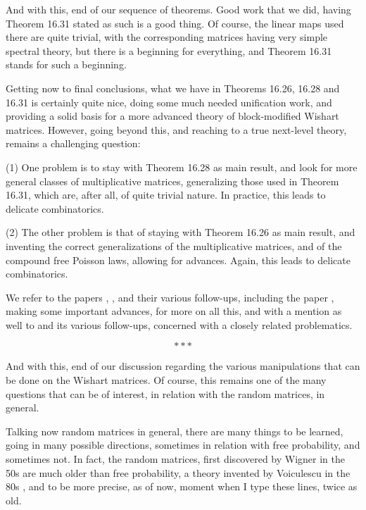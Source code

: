 \documentclass[12pt]{amsbook}
\begin{document}
And with this, end of our sequence of theorems. Good work that we did, having Theorem 16.31 stated as such is a good thing. Of course, the linear maps used there are quite trivial, with the corresponding matrices having very simple spectral theory, but there is a beginning for everything, and Theorem 16.31 stands for such a beginning.

\bigskip

Getting now to final conclusions, what we have in Theorems 16.26, 16.28 and 16.31 is certainly quite nice, doing some much needed unification work, and providing a solid basis for a more advanced theory of block-modified Wishart matrices. However, going beyond this, and reaching to a true next-level theory, remains a challenging question:

\bigskip

(1) One problem is to stay with Theorem 16.28 as main result, and look for more general classes of multiplicative matrices, generalizing those used in Theorem 16.31, which are, after all, of quite trivial nature. In practice, this leads to delicate combinatorics.

\bigskip

(2) The other problem is that of staying with Theorem 16.26 as main result, and inventing the correct generalizations of the multiplicative matrices, and of the compound free Poisson laws,   allowing for advances. Again, this leads to delicate combinatorics.

\bigskip

We refer to the papers \cite{aub}, \cite{bn1}, \cite{bn2} and their various follow-ups, including the paper \cite{anv}, making some important advances, for more on all this, and with a mention as well to \cite{bb+} and its various follow-ups, concerned with a closely related problematics.

$$***$$

\bigskip

And with this, end of our discussion regarding the various manipulations that can be done on the Wishart matrices. Of course, this remains one of the many questions that can be of interest, in relation with the random matrices, in general.

\bigskip

Talking now random matrices in general, there are many things to be learned, going in many possible directions, sometimes in relation with free probability, and sometimes not. In fact, the random matrices, first discovered by Wigner in the 50s \cite{wig} are much older than free probability, a theory invented by Voiculescu in the 80s \cite{vo1}, and to be more precise, as of now, moment when I type these lines, twice as old.
\end{document}
